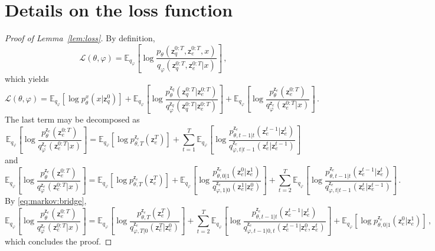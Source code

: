 \documentclass[nolayout]{article}
\theoremstyle{plain}
\theoremstyle{definition}
\theoremstyle{remark}
\newcommand{\latentcont}{\mathsf{z}_e}
\newcommand{\latentdis}{\mathsf{z}_q}
\begin{document}


\section{Details on the loss function}
\label{ap:loss}
\begin{proof}[Proof of Lemma~\ref{lem:loss}]
By definition,
$$
\mathcal{L}(\theta,\varphi) = \mathbb{E}_{q_{\varphi}}\left[\log \frac{p_{\theta}(\latentdis^{0:T},\latentcont^{0:T},x)}{q_{\varphi}(\latentdis^{0:T},\latentcont^{0:T}| x)}\right]\,,
$$
which yields
$$
 \mathcal{L}(\theta,\varphi) = \mathbb{E}_{q_{\varphi}}\left[\log p^x_{\theta}(x|\latentdis^{0})\right]   + \mathbb{E}_{q_{\varphi}}\left[\log \frac{p^{\latentdis}_{\theta}(\latentdis^{0:T}|\latentcont^{0:T})}{q^{\latentdis}_{\varphi}(\latentdis^{0:T}|\latentcont^{0:T})}\right] +\mathbb{E}_{q_{\varphi}}\left[\log \frac{p^{\latentcont}_{\theta}(\latentcont^{0:T})}{q^{\latentcont}_{\varphi}(\latentcont^{0:T}| x)}\right]\,.
$$
The last term may be decomposed as
$$
\mathbb{E}_{q_{\varphi}}\left[\log \frac{p^{\latentcont}_{\theta}(\latentcont^{0:T})}{q^{\latentcont}_{\varphi}(\latentcont^{0:T}| x)}\right] = \mathbb{E}_{q_{\varphi}}\left[\log p^{\latentcont}_{\theta,T}(\latentcont^{T})\right] + \sum_{t=1}^T \mathbb{E}_{q_{\varphi}}\left[\log \frac{p^{\latentcont}_{\theta,t-1|t}(\latentcont^{t-1}|\latentcont^{t})}{q^{\latentcont}_{\varphi,t|t-1}(\latentcont^{t}|\latentcont^{t-1})}\right]
$$
and
$$
\mathbb{E}_{q_{\varphi}}\left[\log \frac{p^{\latentcont}_{\theta}(\latentcont^{0:T})}{q^{\latentcont}_{\varphi}(\latentcont^{0:T}| x)}\right] = \mathbb{E}_{q_{\varphi}}\left[\log p^{\latentcont}_{\theta,T}(\latentcont^{T})\right] +\mathbb{E}_{q_{\varphi}}\left[\log \frac{p^{\latentcont}_{\theta,0|1}(\latentcont^{0}|\latentcont^{1})}{q^{\latentcont}_{\varphi,1|0}(\latentcont^{1}|\latentcont^{0})}\right] + \sum_{t=2}^T \mathbb{E}_{q_{\varphi}}\left[\log \frac{p^{\latentcont}_{\theta,t-1|t}(\latentcont^{t-1}|\latentcont^{t})}{q^{\latentcont}_{\varphi,t|t-1}(\latentcont^{t}|\latentcont^{t-1})}\right]\,.
$$
By \eqref{eq:markov:bridge},
$$
\mathbb{E}_{q_{\varphi}}\left[\log \frac{p^{\latentcont}_{\theta}(\latentcont^{0:T})}{q^{\latentcont}_{\varphi}(\latentcont^{0:T}| x)}\right] = \mathbb{E}_{q_{\varphi}}\left[\log \frac{p^{\latentcont}_{\theta,T}(\latentcont^{T})}{q^{\latentcont}_{\varphi,T|0}(\latentcont^{T}|\latentcont^{0})}\right] + \sum_{t=2}^T \mathbb{E}_{q_{\varphi}}\left[\log \frac{p^{\latentcont}_{\theta,t-1|t}(\latentcont^{t-1}|\latentcont^{t})}{q^{\latentcont}_{\varphi,t-1|0,t}(\latentcont^{t-1}|\latentcont^{0},\latentcont^{t})}\right] + \mathbb{E}_{q_{\varphi}}\left[\log p^{\latentcont}_{\theta,0|1}(\latentcont^{0}|\latentcont^{1})\right]\,,
$$
which concludes the proof.
\end{proof}
\end{document}
